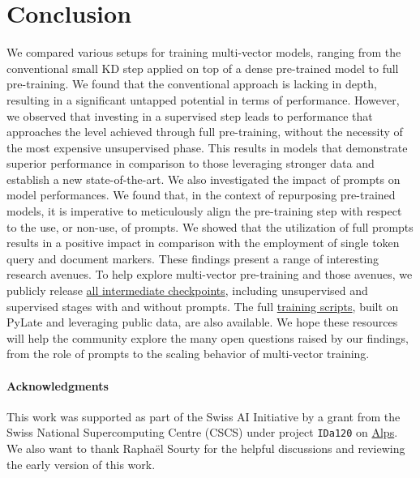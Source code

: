 \section{Conclusion}

We compared various setups for training multi-vector models, ranging from the conventional small KD step applied on top of a dense pre-trained model to full pre-training. We found that the conventional approach is lacking in depth, resulting in a significant untapped potential in terms of performance. However, we observed that investing in a supervised step leads to performance that approaches the level achieved through full pre-training, without the necessity of the most expensive unsupervised phase. This results in models that demonstrate superior performance in comparison to those leveraging stronger data and establish a new state-of-the-art.
We also investigated the impact of prompts on model performances. We found that, in the context of repurposing pre-trained models, it is imperative to meticulously align the pre-training step with respect to the use, or non-use, of prompts. We showed that the utilization of full prompts results in a positive impact in comparison with the employment of single token query and document markers. These findings present a range of interesting research avenues. To help explore multi-vector pre-training and those avenues, we publicly release \href{https://huggingface.co/collections/lightonai/colbert-zero}{all intermediate checkpoints}, including unsupervised and supervised stages with and without prompts. The full \href{https://github.com/lightonai/pylate/tree/main/examples/train/ColBERT-zero/}{training scripts}, built on PyLate and leveraging public data, are also available. We hope these resources will help the community explore the many open questions raised by our findings, from the role of prompts to the scaling behavior of multi-vector training.

\paragraph{Acknowledgments}
This work was supported as part of the Swiss AI Initiative by a grant from the Swiss National Supercomputing Centre (CSCS) under project \texttt{IDa120} on \href{https://www.cscs.ch/computers/alps}{Alps}.
We also want to thank Raphaël Sourty for the helpful discussions and reviewing the early version of this work.


